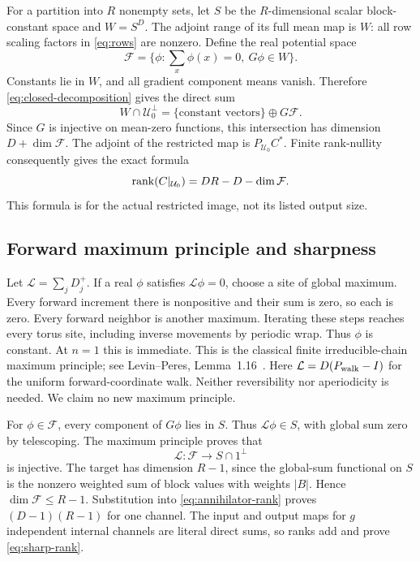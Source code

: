 For a partition into $R$ nonempty sets, let $S$ be the $R$-dimensional
scalar block-constant space and $W=S^D$. The adjoint range of its full
mean map is $W$: all row scaling factors in \eqref{eq:rows} are nonzero.
Define the real potential space
\[
 \mathcal F=\{\phi:\sum_x\phi(x)=0,\ G\phi\in W\}.
\]
Constants lie in $W$, and all gradient component means vanish. Therefore
\eqref{eq:closed-decomposition} gives the direct sum
\[
 W\cap\mathcal U_0^\perp
 =\{\text{constant vectors}\}\oplus G\mathcal F.
\]
Since $G$ is injective on mean-zero functions, this intersection has
dimension $D+\dim\mathcal F$. The adjoint of the restricted map is
$P_{\mathcal U_0}C^*$. Finite rank-nullity consequently gives the exact formula
\begin{equation}\label{eq:annihilator-rank}
 \operatorname{rank}(C|_{\mathcal U_0})=DR-D-\dim\mathcal F.
\end{equation}
This formula is for the actual restricted image, not its listed output size.

\subsection{Forward maximum principle and sharpness}
Let $\mathcal L=\sum_jD_j^+$. If a real $\phi$ satisfies
$\mathcal L\phi=0$, choose a site of global maximum. Every forward
increment there is nonpositive and their sum is zero, so each is zero.
Every forward neighbor is another maximum. Iterating these steps reaches
every torus site, including inverse movements by periodic wrap. Thus
$\phi$ is constant. At $n=1$ this is immediate. This is the classical
finite irreducible-chain maximum principle; see Levin--Peres,
Lemma~1.16~\cite{levinperes}. Here $\mathcal L=D(P_{\rm walk}-I)$ for
the uniform forward-coordinate walk. Neither reversibility nor
aperiodicity is needed. We claim no new maximum principle.

For $\phi\in\mathcal F$, every component of $G\phi$ lies in $S$.
Thus $\mathcal L\phi\in S$, with global sum zero by telescoping.
The maximum principle proves that
\[
 \mathcal L:\mathcal F\longrightarrow S\cap1^\perp
\]
is injective. The target has dimension $R-1$, since the global-sum
functional on $S$ is the nonzero weighted sum of block values with weights
$|B|$. Hence $\dim\mathcal F\le R-1$. Substitution into
\eqref{eq:annihilator-rank} proves $(D-1)(R-1)$ for one channel.
The input and output maps for $g$ independent internal channels are literal
direct sums, so ranks add and prove \eqref{eq:sharp-rank}.

